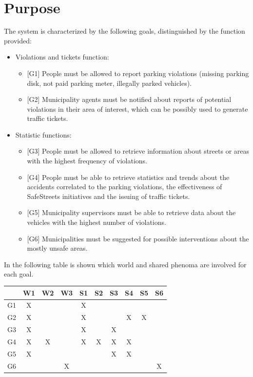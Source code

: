 \documentclass[a4paper]{report}
\begin{document}
\section{Purpose}
The system is characterized by the following goals, distinguished by the function provided:
\begin{itemize}
\item {Violations and tickets function:}

\begin{itemize}
\item{[G1]} \label{G1}People must be allowed to report parking violations (missing parking disk, not paid parking meter, illegally parked vehicles).
\item {[G2]} \label{G2}Municipality agents must be notified about reports of potential violations in their area of interest, which can be possibly used to generate traffic tickets.	
\end{itemize}

\item {Statistic functions:}
\begin{itemize}
\item  {[G3]} \label{G3}People must be allowed to retrieve information about streets or areas with the highest frequency of violations.
\item  {[G4]} \label{G4}People must be able to retrieve statistics and trends about the accidents correlated to the parking violations, the effectiveness of SafeStreets initiatives and the issuing of traffic tickets.
\item  {[G5]} \label{G5}Municipality supervisors must be able to retrieve data about the vehicles with the highest number of violations.
\item  {[G6]} \label{G6}Municipalities must be suggested for possible interventions about the mostly unsafe areas.
\end{itemize}
\end{itemize}

In the following table is shown which world and shared phenoma are involved for each goal.
\begin{table}[H]  
  \centering
  \begin{tabular}{|c|c|c|c|c|c|c|c|c|c|}
    \cline{2-10}
    \multicolumn{1}{c|}{} & W1 & W2 & W3 & S1 & S2 & S3 & S4 & S5 & S6 \\ \hline
    G1 & X &   &   & X &   &   &   &   &   \\ \hline
    G2 & X &   &   & X &   &   & X & X &   \\ \hline
    G3 & X &   &   & X &   & X &   &   &   \\ \hline
    G4 & X & X &   & X & X & X & X &   &   \\ \hline
    G5 & X &   &   &   &   & X & X &   &   \\ \hline
    G6 &   &   & X &   &   &   &   &   & X \\ \hline
  \end{tabular}
\end{table}
\end{document}
